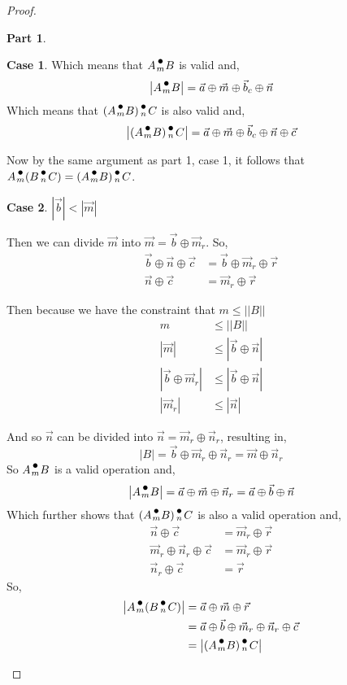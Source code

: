\documentclass[12pt]{book}
\theoremstyle{plain}
\theoremstyle{definition}
\theoremstyle{ppart}
\newtheorem{ppart}{Part}
\theoremstyle{case}
\newtheorem{case}{Case}
\theoremstyle{solution}
\newcommand{\dmult}[1]{\text{\raisebox{1ex}{$\underset{#1}{\,\bullet\,}$}}}
\newcommand{\shape}[1]{\left|#1\right|}
\begin{document}
\begin{proof}
\begin{ppart}
\begin{case}
Which means that $A \dmult{m} B$ is valid and,
\[ \shape{A \dmult{m} B} = \vec{a} \oplus \vec{m} \oplus \vec{b}_c \oplus \vec{n} \]
Which means that $(A \dmult{m} B) \dmult{n} C$ is also valid and,
\[ \shape{(A \dmult{m} B) \dmult{n} C} = \vec{a} \oplus \vec{m} \oplus \vec{b}_c \oplus \vec{n} \oplus \vec{c} \]

Now by the same argument as part 1, case 1, it follows that $A \dmult{m} (B \dmult{n} C) = (A \dmult{m} B) \dmult{n} C$.
\end{case}
\begin{case} $\shape{\vec{b}} < \shape{\vec{m}}$

Then we can divide $\vec{m}$ into $\vec{m} = \vec{b} \oplus \vec{m}_r$.
So,
\begin{align*}
  \vec{b} \oplus \vec{n} \oplus \vec{c} &= \vec{b} \oplus \vec{m}_r \oplus \vec{r} \\
  \vec{n} \oplus \vec{c} &= \vec{m}_r \oplus \vec{r}
\end{align*}

Then because we have the constraint that $m \le \shape{\shape{B}}$
\begin{align*}
  m &\le \shape{\shape{B}} \\
  \shape{\vec{m}} &\le \shape{\vec{b} \oplus \vec{n}} \\
  \shape{\vec{b} \oplus \vec{m}_r} &\le \shape{\vec{b} \oplus \vec{n}} \\
  \shape{\vec{m}_r} &\le \shape{\vec{n}}
\end{align*}

And so $\vec{n}$ can be divided into $\vec{n} = \vec{m}_r \oplus \vec{n}_r$,
resulting in,
\[ \shape{B} = \vec{b} \oplus \vec{m}_r \oplus \vec{n}_r = \vec{m} \oplus \vec{n}_r \]
So $A \dmult{m} B$ is a valid operation and,
\[ \shape{A \dmult{m} B} = \vec{a} \oplus \vec{m} \oplus \vec{n}_r = \vec{a} \oplus \vec{b} \oplus \vec{n} \]
Which further shows that $(A \dmult{m} B) \dmult{n} C$ is also a valid operation and,
\begin{align*}
  \vec{n} \oplus \vec{c} &= \vec{m}_r \oplus \vec{r} \\
  \vec{m}_r \oplus \vec{n}_r \oplus \vec{c} &= \vec{m}_r \oplus \vec{r} \\
  \vec{n}_r \oplus \vec{c} &= \vec{r}
\end{align*}
So,
\begin{align*}
  \shape{A \dmult{m} (B \dmult{n} C)}
  &= \vec{a} \oplus \vec{m} \oplus \vec{r} \\
  &= \vec{a} \oplus \vec{b} \oplus \vec{m}_r \oplus \vec{n}_r \oplus \vec{c} \\
  &= \shape{(A \dmult{m} B) \dmult{n} C}
\end{align*}


\end{case}
\end{ppart}
\end{proof}
\end{document}
